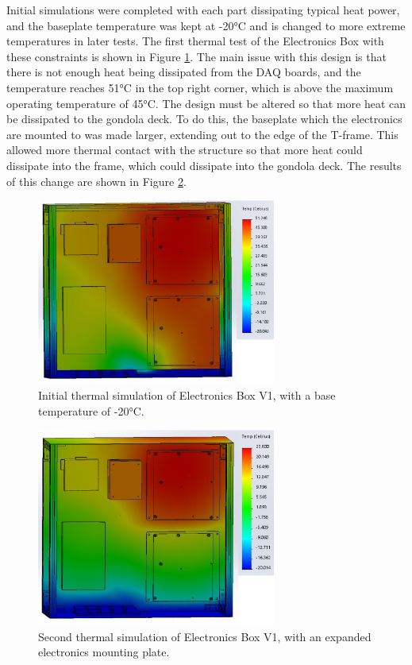 Initial simulations were completed with each part dissipating typical heat power, and the baseplate temperature was kept at -20°C and is changed to more extreme temperatures in later tests. The first thermal test of the Electronics Box with these constraints is shown in Figure \ref{fig:EBOX_V1_TA_1_SQUARECENTRE}. The main issue with this design is that there is not enough heat being dissipated from the DAQ boards, and the temperature reaches 51°C in the top right corner, which is above the maximum operating temperature of 45°C. The design must be altered so that more heat can be dissipated to the gondola deck. To do this, the baseplate which the electronics are mounted to was made larger, extending out to the edge of the T-frame. This allowed more thermal contact with the structure so that more heat could dissipate into the frame, which could dissipate into the gondola deck. The results of this change are shown in Figure \ref{fig:EBOX_V1_TA_2_BIGGERCENTRE}.

\begin{figure}
    \centering
    \includegraphics[width=0.7\textwidth]{chap3_images/LIFE_V2_images/TA_-20_square_centre_plate_FIXED.png}
    \caption{Initial thermal simulation of Electronics Box V1, with a base temperature of -20°C.}
    \label{fig:EBOX_V1_TA_1_SQUARECENTRE}
\end{figure}

\begin{figure}
    \centering
    \includegraphics[width=0.7\textwidth]{chap3_images/LIFE_V2_images/TA_-20_expanded_centre_plate_FIXED.png}
    \caption{Second thermal simulation of Electronics Box V1, with an expanded electronics mounting plate.}
    \label{fig:EBOX_V1_TA_2_BIGGERCENTRE}
\end{figure}

